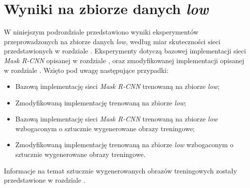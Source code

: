 \section{Wyniki na zbiorze danych \textit{low}}
W niniejszym podrozdziale przedstawiono wyniki eksperymentów przeprowadzonych na zbiorze danych \textit{low}, według miar skuteczności sieci przedstawionych w rozdziale .
Eksperymenty dotyczą bazowej implementacji sieci \textit{Mask R-CNN} \cite{matterport-mask-rcnn} opisanej w rozdziale , oraz zmodyfikowanej implementacji opisanej w rozdziale .
 Wzięto pod uwagę następujące przypadki:

\begin{itemize}
 \item Bazową implementację sieci \textit{Mask R-CNN} trenowaną na zbiorze \textit{low};
 \item Zmodyfikowaną implementację trenowaną na zbiorze \textit{low};
 \item Bazową implementację sieci \textit{Mask R-CNN} trenowaną na zbiorze \textit{low} wzbogaconym o sztucznie wygenerowane obrazy treningowe;
 \item Zmodyfikowaną implementację trenowaną na zbiorze \textit{low} wzbogaconym o sztucznie wygenerowane obrazy treningowe.
\end{itemize}

Informacje na temat sztucznie wygenerowanych obrazów treningowych zostały przedstawione w rozdziale .
